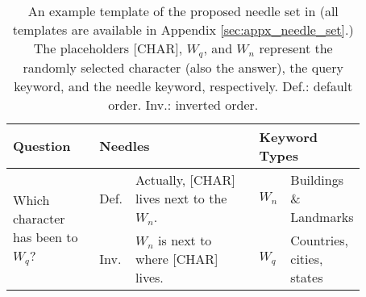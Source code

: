 \begin{table*}[t]
	\small
	\setlength\tabcolsep{5pt}
	\centering
    \begin{tabular}{p{0.25\linewidth} p{0.05\linewidth} p{0.37\linewidth} p{0.02\linewidth} p{0.18\linewidth}}
        \toprule
        \textbf{Question} & \multicolumn{2}{l}{\textbf{Needles}} & \multicolumn{2}{l}{\textbf{Keyword Types}}\\
        \midrule
        \multirow{2}{*}{Which character has been to $W_q$?} & Def. & Actually, [CHAR] lives next to the $W_n$. & $W_n$ & Buildings \& Landmarks\\
         & Inv. & $W_n$ is next to where [CHAR] lives. & $W_q$ & Countries, cities, states \\
        \bottomrule
    \end{tabular}
	\caption{An example template of the proposed needle set in \framework (all templates are available in Appendix \ref{sec:appx_needle_set}.) The placeholders [CHAR], $W_q$, and $W_n$ represent the randomly selected character (also the answer), the query keyword, and the needle keyword, respectively. Def.:
      default order. Inv.: inverted order.}
	\label{tab:needle_set_one}
\end{table*}
        
        